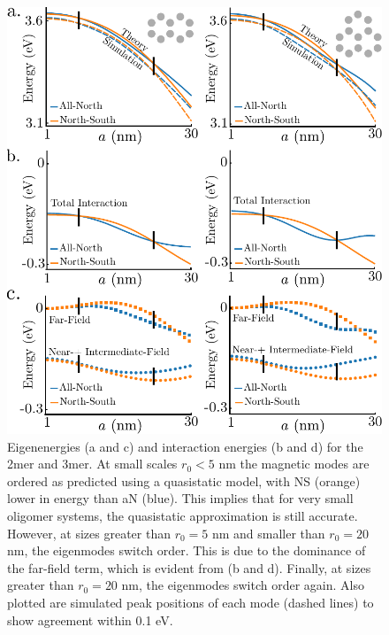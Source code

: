 \documentclass[journal=apchd5,manuscript=article]{achemso}
\begin{document}




\begin{figure}
\includegraphics{fig2.pdf}
\caption{Eigenenergies (a and c) and interaction energies (b and d) for the 2mer and 3mer. At small scales $r_0 < 5$ nm the magnetic modes are ordered as predicted using a quasistatic model, with NS (orange) lower in energy than aN (blue). This implies that for very small oligomer systems, the quasistatic approximation is still accurate. However, at sizes greater than $r_0 = 5$ nm and smaller than $r_0 = 20$ nm, the eigenmodes switch order. This is due to the dominance of the far-field term, which is evident from (b and d). Finally, at sizes greater than $r_0 = 20$ nm, the eigenmodes switch order again. Also plotted are simulated peak positions of each mode (dashed lines) to show agreement within 0.1 eV.}
\label{scaling}
\end{figure}
\end{document}
